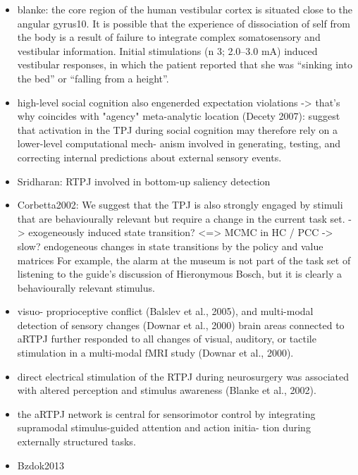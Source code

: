 \documentclass{article} %
\begin{document}
\begin{itemize}
\begin{itemize}
\item
blanke:
the core region of the human vestibular cortex is situated close to the angular gyrus10. It is possible that the experience of dissociation of self from the body is a result of failure to integrate complex somatosensory and vestibular information.
Initial stimulations (n 3; 2.0–3.0 mA) induced vestibular responses, in which the patient reported that she was “sinking into the bed” or “falling from a height”.

\item
high-level social cognition also engenerded expectation violations
-> that's why coincides with "agency" meta-analytic location
(Decety 2007):
suggest that activation in the TPJ during social cognition may therefore rely on a lower-level computational mech- anism involved in generating, testing, and correcting internal predictions about external sensory events.


\item
Sridharan: RTPJ involved in bottom-up saliency detection


\item
Corbetta2002:
 We suggest that the TPJ is also strongly engaged by stimuli that are behaviourally relevant but require a change in the current task set. 
 -> exogeneously induced state transition?
 <=> MCMC in HC / PCC -> slow? endogeneous changes in state transitions by the policy and value matrices
 For example, the alarm at the museum is not part of the task set of listening to the guide’s discussion of Hieronymous Bosch, but it is clearly a behaviourally relevant stimulus.

\item
visuo- proprioceptive conflict (Balslev et al., 2005), and multi-modal detection of sensory changes (Downar et al., 2000)
brain areas connected to aRTPJ further responded to all changes of visual, auditory, or tactile stimulation in a multi-modal fMRI study (Downar et al., 2000).

\item
direct electrical stimulation of the RTPJ during neurosurgery was associated with altered perception and stimulus awareness (Blanke et al., 2002).

\item
the aRTPJ network is central for sensorimotor control by integrating supramodal stimulus-guided attention and action initia- tion during externally structured tasks.

\item
Bzdok2013


\end{itemize}
\end{itemize}
\end{document}
